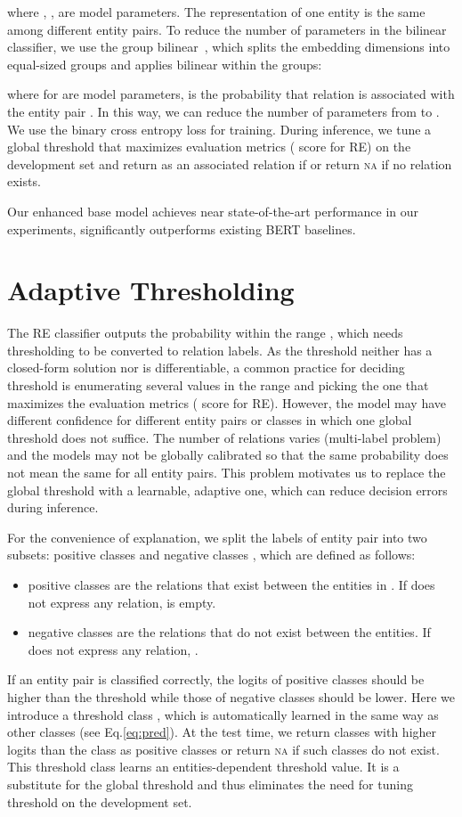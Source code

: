 \documentclass[letterpaper]{article}
\begin{document}
where , ,  are model parameters.
The representation of one entity is the same among different entity pairs.
To reduce the number of parameters in the bilinear classifier, we use the group bilinear~\cite{Zheng2019LearningDB,Tang2020OTE-ACL}, which splits the embedding dimensions into  equal-sized groups and applies bilinear within the groups:

where  for  are model parameters,  is the probability that relation  is associated with the entity pair .
In this way, we can reduce the number of parameters from  to .
We use the binary cross entropy loss for training.
During inference, we tune a global threshold  that maximizes evaluation metrics ( score for RE) on the development set and return  as an associated relation if  or return \textsc{na} if no relation exists.

Our enhanced base model achieves near state-of-the-art performance in our experiments, significantly outperforms existing BERT baselines.


\section{Adaptive Thresholding}
The RE classifier outputs the probability  within the range , which needs thresholding to be converted to relation labels.
As the threshold neither has a closed-form solution nor is differentiable, a common practice for deciding threshold is enumerating several values in the range  and picking the one that maximizes the evaluation metrics ( score for RE).
However, the model may have different confidence for different entity pairs or classes in which one global threshold does not suffice.
The number of relations varies (multi-label problem) and the models may not be globally calibrated so that the same probability does not mean the same for all entity pairs.
This problem motivates us to replace the global threshold with a learnable, adaptive one, which can reduce decision errors during inference.

For the convenience of explanation, we split the labels of entity pair  into two subsets: positive classes  and negative classes , which are defined as follows:
\begin{itemize}
    \item positive classes  are the relations that exist between the entities in .
    If  does not express any relation,  is empty.
    \item negative classes  are the relations that do not exist between the entities.
    If  does not express any relation, .
\end{itemize}
If an entity pair is classified correctly, the logits of positive classes should be higher than the threshold while those of negative classes should be lower.
Here we introduce a threshold class , which is automatically learned in the same way as other classes (see Eq.\eqref{eq:pred}).
At the test time, we return classes with higher logits than the  class as positive classes or return \textsc{na} if such classes do not exist.
This threshold class learns an entities-dependent threshold value.
It is a substitute for the global threshold and thus eliminates the need for tuning threshold on the development set.
\end{document}
